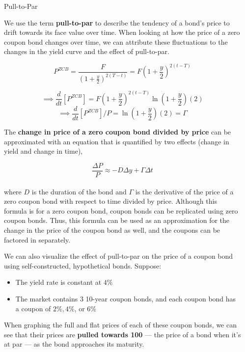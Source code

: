 \documentclass[final]{beamer}
\newlength{\sepwidth}
\newlength{\colwidth}
\newcommand{\separatorcolumn}{\begin{column}{\sepwidth}\end{column}}
\begin{document}
\begin{frame}[t]
\begin{columns}[t]
\separatorcolumn

\begin{column}{\colwidth}


  \begin{block}{Pull-to-Par}

    We use the term \textbf{pull-to-par} to describe the tendency of a bond's price to drift towards its face value over time. When looking at how the price of a zero coupon bond changes over time, we can attribute these fluctuations to the changes in the yield curve and the effect of pull-to-par.

    $$P^{ZCB} = \frac{F}{\left(1+\frac{y}{2}\right)^{2(T-t)}} = F\left(1+\frac{y}{2}\right)^{2(t-T)}$$
    
    $$\implies \frac{d}{dt}\left[P^{ZCB}\right] = F\left(1+\frac{y}{2}\right)^{2(t-T)}\ln\left(1+\frac{y}{2}\right)(2)$$
    $$\implies \frac{d}{dt}\left[P^{ZCB}\right]/P = \ln\left(1+\frac{y}{2}\right)(2) = \Gamma$$
    
    The \textbf{change in price of a zero coupon bond divided by price} can be approximated with an equation that is quantified by two effects (change in yield and change in time),
    
    $$\frac{\Delta P}{P} \approx -D\Delta y + \Gamma \Delta t$$\\
    
    where $D$ is the duration of the bond and $\Gamma$ is the derivative of the price of a zero coupon bond with respect to time divided by price. Although this formula is for a zero coupon bond, coupon bonds can be replicated using zero coupon bonds. Thus, this formula can be used as an approximation for the change in the price of the coupon bond as well, and the coupons can be factored in separately.
    

    We can also visualize the effect of pull-to-par on the price of a coupon bond using self-constructed, hypothetical bonds. Suppose:
    \begin{itemize}
        \item The yield rate is constant at $4\%$
        \item The market contains 3 10-year coupon bonds, and each coupon bond has a coupon of $2\%, 4\%$, or $6\%$
    \end{itemize}
    When graphing the full and flat prices of each of these coupon bonds, we can see that their prices are \textbf{pulled towards 100} — the price of a bond when it's at par — as the bond approaches its maturity.
    


\end{block}
\end{column}
\end{columns}
\end{frame}
\end{document}
